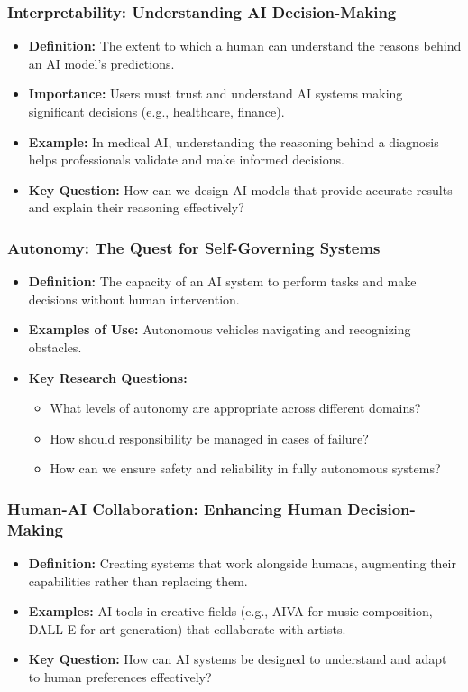\documentclass{beamer}
\begin{document}
\begin{frame}[fragile]
    \frametitle{Interpretability: Understanding AI Decision-Making}
    \begin{itemize}
        \item \textbf{Definition:} The extent to which a human can understand the reasons behind an AI model's predictions.
        \item \textbf{Importance:} Users must trust and understand AI systems making significant decisions (e.g., healthcare, finance).
        \item \textbf{Example:} In medical AI, understanding the reasoning behind a diagnosis helps professionals validate and make informed decisions.
        \item \textbf{Key Question:} How can we design AI models that provide accurate results and explain their reasoning effectively?
    \end{itemize}
\end{frame}

\begin{frame}[fragile]
    \frametitle{Autonomy: The Quest for Self-Governing Systems}
    \begin{itemize}
        \item \textbf{Definition:} The capacity of an AI system to perform tasks and make decisions without human intervention.
        \item \textbf{Examples of Use:} Autonomous vehicles navigating and recognizing obstacles.
        \item \textbf{Key Research Questions:}
        \begin{itemize}
            \item What levels of autonomy are appropriate across different domains?
            \item How should responsibility be managed in cases of failure?
            \item How can we ensure safety and reliability in fully autonomous systems?
        \end{itemize}
    \end{itemize}
\end{frame}

\begin{frame}[fragile]
    \frametitle{Human-AI Collaboration: Enhancing Human Decision-Making}
    \begin{itemize}
        \item \textbf{Definition:} Creating systems that work alongside humans, augmenting their capabilities rather than replacing them.
        \item \textbf{Examples:} AI tools in creative fields (e.g., AIVA for music composition, DALL-E for art generation) that collaborate with artists.
        \item \textbf{Key Question:} How can AI systems be designed to understand and adapt to human preferences effectively?
    \end{itemize}
\end{frame}
\end{document}
